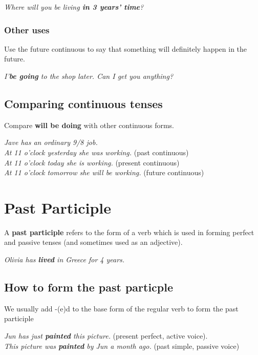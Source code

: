 \documentclass[hidelinks,10pt,a4paper]{article}
\begin{document}
\begin{center}
	\textit{Where will you be living \textbf{in 3 years' time}? }
\end{center}

\subsubsection{Other uses}
Use the future continuous to say that something will definitely happen in the future.

\begin{center}
	\textit{I'\textbf{be going} to the shop later. Can I get you anything?}
\end{center}

\subsection{Comparing continuous tenses}
Compare \textbf{will be doing} with other continuous forms.

\begin{center}
	\textit{Jave has an ordinary 9/8 job. \\
	At 11 o'clock yesterday she was working.} (past continuous) \\
	\textit{At 11 o'clock today she is working.} (present continuous) \\
	\textit{At 11 o'clock tomorrow she will be working.} (future continuous)
\end{center}

\section{Past Participle}
A \textbf{past participle} refers to the form of a verb which is used in forming perfect and passive tenses (and sometimes used as an adjective).

\begin{center}
	\textit{Olivia has \textbf{lived} in Greece for 4 years.}
\end{center}

\subsection{How to form the past particple}
We usually add -(e)d to the base form of the regular verb to form the past participle

\begin{center}
	\textit{Jun has just \textbf{painted} this picture.} (present perfect, active voice). \\
	\textit{This picture was \textbf{painted} by Jun a month ago.} (past simple, passive voice)
\end{center}
\end{document}
